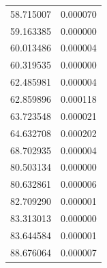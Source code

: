 \begin{longtable}{rr}
58.715007 & 0.000070 \\
59.163385 & 0.000000 \\
60.013486 & 0.000004 \\
60.319535 & 0.000000 \\
62.485981 & 0.000004 \\
62.859896 & 0.000118 \\
63.723548 & 0.000021 \\
64.632708 & 0.000202 \\
68.702935 & 0.000004 \\
80.503134 & 0.000000 \\
80.632861 & 0.000006 \\
82.709290 & 0.000001 \\
83.313013 & 0.000000 \\
83.644584 & 0.000001 \\
88.676064 & 0.000007 \\
\end{longtable}
